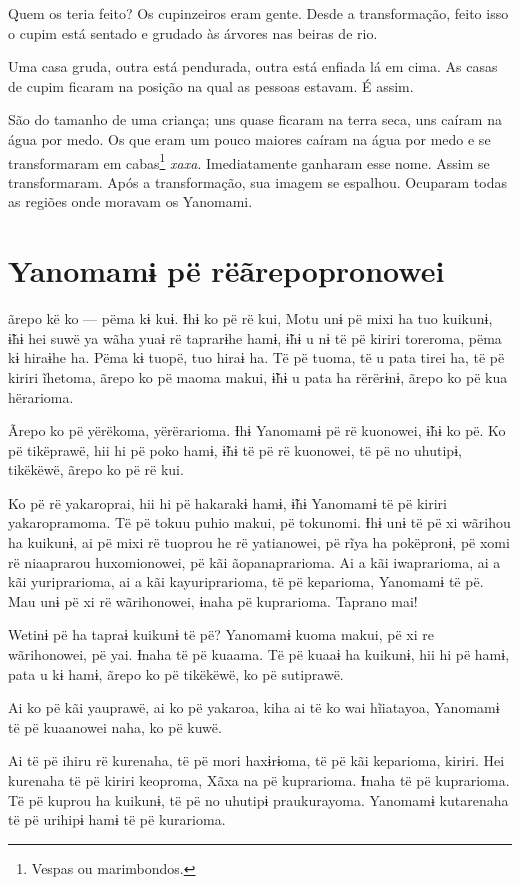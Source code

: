 Quem os teria feito? Os cupinzeiros eram gente. Desde a
transformação, feito isso o cupim está sentado e grudado às árvores nas
beiras de rio.

Uma casa gruda, outra está pendurada, outra está enfiada lá em cima. As
casas de cupim ficaram na posição na qual as pessoas estavam.
É assim. 

São do tamanho de uma criança; uns quase ficaram na terra seca, uns
caíram na água por medo. Os que eram um pouco maiores caíram na água por
medo e se transformaram em cabas\footnote{Vespas ou marimbondos.} \textit{xaxa}. Imediatamente ganharam esse nome. Assim se transformaram. Após a transformação,
sua imagem se espalhou. Ocuparam todas as regiões onde moravam os
Yanomami. 

\chapter[Yanomamɨ pë rë ãrepopronowei]{Yanomamɨ pë rë\break ãrepopronowei}

 ãrepo kë ko --- pëma kɨ kuɨ. Ɨhɨ ko pë rë kui, Motu unɨ pë mixi ha tuo kuikunɨ, ɨ̃hɨ hei suwë ya wãha
yuaɨ rë taprarɨhe hamɨ, ɨ̃hɨ u nɨ të pë kiriri toreroma, pëma kɨ hiraɨhe
ha. Pëma kɨ tuopë, tuo hiraɨ ha. Të pë tuoma, të u pata tirei ha, të pë
kiriri ĩhetoma, ãrepo ko pë maoma makui, ɨ̃hɨ u pata ha rërërɨnɨ, ãrepo
ko pë kua hërarioma. 

Ãrepo ko pë yërëkoma, yërërarioma. Ɨhɨ Yanomamɨ pë rë kuonowei, ɨ̃hɨ ko
pë. Ko pë tikëprawë, hii hi pë poko hamɨ, ɨ̃hɨ të pë rë kuonowei, të pë
no uhutipɨ, tikëkëwë, ãrepo ko pë rë kui. 

Ko pë rë yakaroprai, hii hi pë hakarakɨ hamɨ, ɨ̃hɨ Yanomamɨ të pë kiriri
yakaropramoma. Të pë tokuu puhio makui, pë tokunomi. Ɨhɨ unɨ të pë xi
wãrihou ha kuikunɨ, ai pë mixi rë tuoprou he rë yatianowei, pë rĩya ha
pokëpronɨ, pë xomi rë niaaprarou huxomionowei, pë kãi ãopanaprarioma. Ai
a kãi iwaprarioma, ai a kãi yuriprarioma, ai a kãi kayuriprarioma, të pë
keparioma, Yanomamɨ të pë. Mau unɨ pë xi rë wãrihonowei, ɨnaha pë
kuprarioma. Taprano mai! 

Wetinɨ pë ha tapraɨ kuikunɨ të pë? Yanomamɨ kuoma makui, pë xi re
 wãrihonowei, pë yai. Ɨnaha të pë kuaama. Të pë kuaaɨ ha kuikunɨ, hii hi
 pë hamɨ, pata u kɨ hamɨ, ãrepo ko pë tikëkëwë, ko pë sutiprawë. 

Ai ko pë kãi yauprawë, ai ko pë yakaroa, kiha ai të ko wai hĩiatayoa,
Yanomamɨ të pë kuaanowei naha, ko pë kuwë. 

Ai të pë ihiru rë kurenaha, të pë mori haxɨrɨoma, të pë kãi keparioma,
kiriri. Hei kurenaha të pë kiriri keoproma, Xãxa na pë kuprarioma. Ɨnaha
të pë kuprarioma. Të pë kuprou ha kuikunɨ, të pë no uhutipɨ
praukurayoma. Yanomamɨ kutarenaha të pë urihipɨ hamɨ të pë kurarioma.

